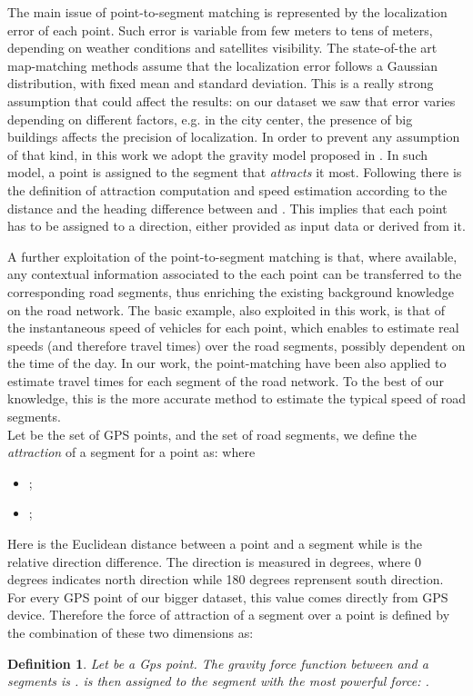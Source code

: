 \documentclass[5p]{elsarticle}
\newtheorem{definition}{Definition}
\begin{document}
The main issue of point-to-segment matching is represented by the localization error of each point. Such error is variable from few meters to tens of meters, 
depending on weather conditions and satellites visibility. 
The state-of-the art map-matching methods assume that the localization error follows a Gaussian distribution, with fixed mean and standard deviation. This is a really strong assumption 
that could affect the results: 
on our dataset we saw that error varies depending on different factors, e.g. in the city center, the presence of big buildings affects the precision of localization. 
In order to prevent any assumption of that kind, in this work we adopt the gravity model proposed in \cite{cintia2013gravity}.
In such model, a point  is assigned to the segment  that {\em attracts} it most. Following there is the definition of attraction computation and speed estimation according
to the distance and the heading difference between  and . 
This implies that each point has to be assigned to a direction, either provided as input data or derived from it. 


A further exploitation of the point-to-segment matching is that, where available, any contextual information associated to the each point can be transferred to the corresponding road segments, 
thus enriching the existing background knowledge on the road network. The basic example, also exploited in this work, is that of the instantaneous speed of vehicles for each point, 
which enables to estimate real speeds (and therefore travel times) over the road segments, possibly dependent on the time of the day. In our work, the point-matching have been
also applied to estimate travel times for each segment of the road network. To the best of our knowledge, this is the more accurate
method to estimate the typical speed of road segments.  \\



\label{gravitymodel}
Let  be the set of GPS points,  and the set of road segments,  we define the \emph{attraction} of a segment  for a point  as:
 where 
\begin{itemize}
\item ; 
\item ;  
\end{itemize} 
Here  is the Euclidean distance between a point and a segment while  is the relative direction difference. The direction is measured in degrees,
where 0 degrees indicates north direction while 180 degrees reprensent south direction. For every GPS point of our bigger dataset, this value
comes directly from GPS device.
Therefore the force of attraction of a segment over a point is defined by the combination of these two dimensions as:
\begin{definition}
Let  be a Gps point. The gravity force function between  and a segments  is  .
 is then assigned to the segment with the most powerful force: .
\end{definition}
\end{document}
